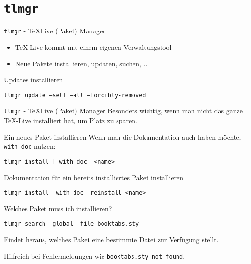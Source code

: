 \section{\texttt{tlmgr}}

\begin{frame}[fragile]{
  \texttt{tlmgr} - \TeX Live (Paket) Manager
}
  \begin{itemize}
    \item \TeX-Live kommt mit einem eigenen Verwaltungstool
    \item Neue Pakete installieren, updaten, suchen, ...
  \end{itemize}


  \begin{block}{Updates installieren}
    \begin{center}
      \texttt{tlmgr update --self --all --forcibly-removed}
    \end{center}
  \end{block}
\end{frame}

\begin{frame}[fragile]{
  \texttt{tlmgr} - \TeX Live (Paket) Manager
}
  Besonders wichtig, wenn man nicht das ganze TeX-Live installiert hat,
  um Platz zu sparen.

  \begin{block}{Ein neues Paket installieren}
    Wenn man die Dokumentation auch haben möchte, \texttt{--with-doc} nutzen:
    \begin{center}
      \texttt{tlmgr install [--with-doc] <name>}
    \end{center}
  \end{block}

  \begin{block}{Dokumentation für ein bereits installiertes Paket installieren}
    \begin{center}
      \texttt{tlmgr install --with-doc --reinstall <name>}
    \end{center}
  \end{block}

  \begin{block}{Welches Paket muss ich installieren?}
    \begin{center}
      \texttt{tlmgr search --global --file booktabs.sty}
    \end{center}
    Findet heraus, welches Paket eine bestimmte Datei zur Verfügung stellt.

    Hilfreich bei Fehlermeldungen wie \texttt{booktabs.sty not found}.
  \end{block}
\end{frame}
